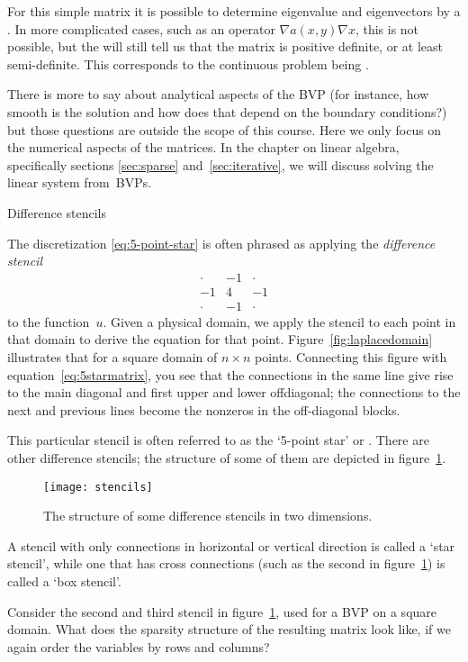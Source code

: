 \begin{remark}
  For this simple matrix it is possible to determine
  eigenvalue and eigenvectors by a .
  In more complicated cases, such as an operator $\nabla a(x,y)\nabla x$,
  this is not possible, but the 
  will still tell us that the matrix is positive definite,
  or at least semi-definite. This corresponds to the
  continuous problem being .
\end{remark}

There is more to say about analytical aspects of the \ac{BVP} (for
instance, how smooth is the solution and how does that depend on the
boundary conditions?) but those questions are outside the scope of
this course. Here we only focus on the numerical aspects of the
matrices. In the  chapter on linear algebra,
specifically sections \ref{sec:sparse} and~\ref{sec:iterative},
we will discuss solving the linear system from~\acp{BVP}.

 {Difference stencils}
\label{sec:diff-stencil}

The discretization \eqref{eq:5-point-star} is often phrased as
applying the
%
\emph{difference stencil}%
%
%
\begin{equation}
\begin{matrix}
  \cdot&-1&\cdot\\ -1&4&-1\\ \cdot&-1&\cdot
\end{matrix}
\end{equation}
to the function~$u$. Given a physical domain, we apply the stencil to
each point in that domain to derive the equation for that
point. Figure~\ref{fig:laplacedomain} illustrates that for a square domain
of $n\times n$ points.
Connecting this figure with equation~\eqref{eq:5starmatrix}, you
see that the connections in the same line give rise to the main
diagonal and first upper and lower offdiagonal; the connections to the
next and previous lines become the nonzeros in the off-diagonal
blocks.

This particular stencil is often referred to as
the `5-point star' or .
There are other difference stencils; the structure
of some of them are depicted in figure~\ref{fig:stencils}.
\begin{figure}[ht]
  \centering
  \texttt{[image: stencils]}
  \caption{The structure of some difference stencils in two dimensions.}
  \label{fig:stencils}
\end{figure}
A stencil with only connections in horizontal or vertical direction is
called a `star stencil', while one that has cross connections (such as
the second in figure~\ref{fig:stencils}) is called a `box
stencil'. 
\begin{exercise}
  Consider the second and third stencil in figure~\ref{fig:stencils}, used for a
  \ac{BVP} on a square domain.
  What does the sparsity structure of the resulting matrix look like,
  if we again order the variables by rows and columns?
\end{exercise}

